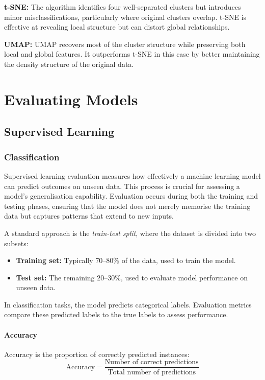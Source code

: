 \documentclass[9pt]{extarticle}
\begin{document}
\textbf{t-SNE:} The algorithm identifies four well-separated clusters but introduces minor misclassifications, particularly where original clusters overlap. t-SNE is effective at revealing local structure but can distort global relationships.

\textbf{UMAP:} UMAP recovers most of the cluster structure while preserving both local and global features. It outperforms t-SNE in this case by better maintaining the density structure of the original data.

\section{Evaluating Models}
\subsection{Supervised Learning}
\subsubsection{Classification}

Supervised learning evaluation measures how effectively a machine learning model can predict outcomes on unseen data. This process is crucial for assessing a model's generalisation capability. Evaluation occurs during both the training and testing phases, ensuring that the model does not merely memorise the training data but captures patterns that extend to new inputs.

A standard approach is the \textit{train-test split}, where the dataset is divided into two subsets:
\begin{itemize}
    \item \textbf{Training set:} Typically 70--80\% of the data, used to train the model.
    \item \textbf{Test set:} The remaining 20--30\%, used to evaluate model performance on unseen data.
\end{itemize}

In classification tasks, the model predicts categorical labels. Evaluation metrics compare these predicted labels to the true labels to assess performance.

\paragraph{Accuracy}

Accuracy is the proportion of correctly predicted instances:
\[
\text{Accuracy} = \frac{\text{Number of correct predictions}}{\text{Total number of predictions}}
\]
\end{document}

